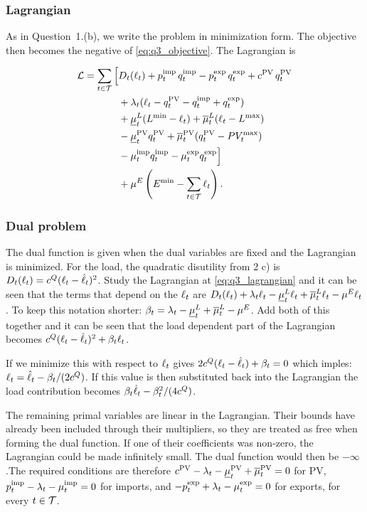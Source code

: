 \subsubsection{Lagrangian}

As in Question~1.(b), we write the problem in minimization form. The objective
then becomes the negative of \eqref{eq:q3_objective}. The Lagrangian is

\begin{equation}
\begin{aligned}
\mathcal{L}
= \sum_{t\in\mathcal{T}} \Big[
& D_t(\ell_{t})
+ p^{\mathrm{imp}}_{t}\,q^{\mathrm{imp}}_{t}
- p^{\mathrm{exp}}_{t}\,q^{\mathrm{exp}}_{t}
+ c^{\mathrm{PV}}\,q^{\mathrm{PV}}_{t} \\
&+ \lambda_{t}(\ell_{t}-q^{\mathrm{PV}}_{t}-q^{\mathrm{imp}}_{t}+q^{\mathrm{exp}}_{t}) \\
&+ \underline{\mu}^{L}_{t}(L^{\min}-\ell_{t})
+ \overline{\mu}^{L}_{t}(\ell_{t}-L^{\max}) \\
&- \underline{\mu}^{\mathrm{PV}}_{t}q^{\mathrm{PV}}_{t}
+ \overline{\mu}^{\mathrm{PV}}_{t}(q^{\mathrm{PV}}_{t}-PV_{t}^{\max}) \\
&- \mu^{\mathrm{imp}}_{t}q^{\mathrm{imp}}_{t}
- \mu^{\mathrm{exp}}_{t}q^{\mathrm{exp}}_{t}
\Big] \\
&+ \mu^{E}
\left(
E^{\min}-\sum_{t\in\mathcal{T}}\ell_{t}
\right).
\end{aligned}
\label{eq:q3_lagrangian}
\end{equation}
\subsubsection{Dual problem}
The dual function is given when the dual variables are fixed and the Lagrangian is minimized. For the load, the quadratic disutility from 2 c) is $D_t(\ell_{t})=c^Q(\ell_{t}-\hat{\ell}_{t})^2$. Study the Lagrangian at \eqref{eq:q3_lagrangian} and it can be seen that the terms that depend on the $\ell_{t}$ are
$D_t(\ell_{t})+\lambda_{t}\ell_{t}-\underline{\mu}^{L}_{t}\ell_{t}+\overline{\mu}^{L}_{t}\ell_{t}-\mu^{E}\ell_{t}$. To keep this notation shorter: $\beta_t=\lambda_{t}-\underline{\mu}^{L}_{t}+\overline{\mu}^{L}_{t}-\mu^{E}$. Add both of this together and it can be seen that the load dependent part of the Lagrangian becomes $c^Q(\ell_{t}-\hat{\ell}_{t})^2+\beta_t\ell_{t}$.

If we minimize this with respect to $\ell_{t}$ gives $2c^Q(\ell_{t}-\hat{\ell}_{t})+\beta_t=0$ which imples: $\ell_{t}=\hat{\ell}_{t}-\beta_t/(2c^Q)$. If this value is then substituted back into the Lagrangian the load contribution becomes $\beta_t\hat{\ell}_{t}-\beta_t^2/(4c^Q)$.

The remaining primal variables are linear in the Lagrangian. Their bounds have
already been included through their multipliers, so they are treated as free when forming the dual function. If one of their coefficients was non-zero, the Lagrangian could be made infinitely small. The dual function would then be $-\infty$.The required conditions are therefore
$c^{\mathrm{PV}}-\lambda_{t}-\underline{\mu}^{\mathrm{PV}}_{t}+\overline{\mu}^{\mathrm{PV}}_{t}=0$ for PV,
$p^{\mathrm{imp}}_{t}-\lambda_{t}-\mu^{\mathrm{imp}}_{t}=0$ for imports, and
$-p^{\mathrm{exp}}_{t}+\lambda_{t}-\mu^{\mathrm{exp}}_{t}=0$ for exports, for every $t\in\mathcal{T}$.

